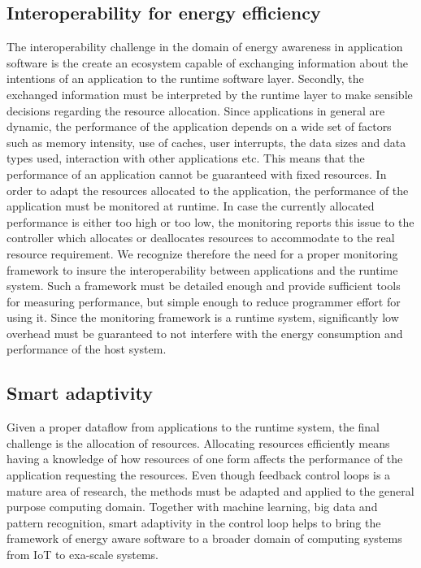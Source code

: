 \documentclass{article}
\begin{document}
\subsection{Interoperability for energy efficiency}
\label{sec:inter}
The interoperability challenge in the domain of energy awareness in application software is the create an ecosystem capable of exchanging information about the intentions of an application to the runtime software layer. Secondly, the exchanged information must be interpreted by the runtime layer to make sensible decisions regarding the resource allocation.
Since applications in general are dynamic, the performance of the application depends on a wide set of factors such as memory intensity, use of caches, user interrupts, the data sizes and data types used, interaction with other applications etc. 
This means that the performance of an application cannot be guaranteed with fixed resources.
In order to adapt the resources allocated to the application, the performance of the application must be monitored at runtime.
In case the currently allocated performance is either too high or too low, the monitoring reports this issue to the controller which allocates or deallocates resources to accommodate to the real resource requirement.
We recognize therefore the need for a proper monitoring framework to insure the interoperability between applications and the runtime system.
Such a framework must be detailed enough and provide sufficient tools for measuring performance, but simple enough to reduce programmer effort for using it.
Since the monitoring framework is a runtime system, significantly low overhead must be guaranteed to not interfere with the energy consumption and performance of the host system.

\subsection{Smart adaptivity}
\label{sec:smart}
Given a proper dataflow from applications to the runtime system, the final challenge is the allocation of resources. 
Allocating resources efficiently means having a knowledge of how resources of one form affects the performance of the application requesting the resources.
Even though feedback control loops is a mature area of research, the methods must be adapted and applied to the general purpose computing domain. Together with machine learning, big data and pattern recognition, smart adaptivity in the control loop helps to bring the framework of energy aware software to a broader domain of computing systems from IoT to exa-scale systems.
\end{document}
